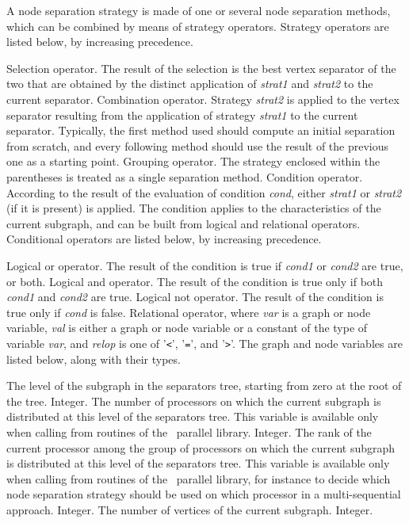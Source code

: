 A node separation strategy is made of one or several node separation
methods, which can be combined by means of strategy
operators. Strategy operators are listed below, by increasing
precedence.

\begin{itemize}
Selection operator. The result of the selection is the best vertex separator of
the two that are obtained by the distinct application of {\it strat1\/} and
{\it strat2\/} to the current separator.
Combination operator. Strategy {\it strat2\/} is applied to the vertex
separator resulting from the application of strategy {\it strat1\/} to the
current separator. Typically, the first method used should compute an initial
separation from scratch, and every following method should use the
result of the previous one as a starting point.
\iteme[{\tt (}{\it strat\/}{\tt )}]
Grouping operator.
The strategy enclosed within the parentheses is treated as a single
separation method.
Condition operator. According to the result of the evaluation of condition
{\it cond}, either {\it strat1\/} or {\it strat2\/} (if it is present) is
applied. The condition applies to the characteristics of the current subgraph,
and can be built from logical and relational operators. Conditional
operators are listed below, by increasing precedence.
\begin{itemize}
Logical or operator. The result of the condition is true if {\it cond1\/}
or {\it cond2\/} are true, or both.
Logical and operator. The result of the condition is true only if both
{\it cond1\/} and {\it cond2\/} are true.
\iteme[{\tt !}{\it cond}]
Logical not operator. The result of the condition is true only if
{\it cond\/} is false.
Relational operator, where {\it var\/} is a graph or node variable,
{\it val\/} is either a graph or node variable or a constant of the type of
variable {\it var\/}, and {\it relop\/} is one of
'{\tt\verb+<+}', '{\tt\verb+=+}', and '{\tt\verb+>+}'.
The graph and node variables are listed below, along with their types.
\begin{itemize}
\iteme[{\tt levl}]
The level of the subgraph in the separators tree, starting from zero at the root
of the tree.
Integer.
\iteme[{\tt proc}]
The number of processors on which the current subgraph is distributed
at this level of the separators tree. This variable is available only
when calling from routines of the \ptscotch\ parallel library.
Integer.
\iteme[{\tt rank}]
The rank of the current processor among the group of processors on
which the current subgraph is distributed at this level of the
separators tree. This variable is available only
when calling from routines of the \ptscotch\ parallel library, for
instance to decide which node separation strategy should be used on
which processor in a multi-sequential approach.
Integer.
\iteme[{\tt vert}]
The number of vertices of the current subgraph.
Integer.
\end{itemize}
\end{itemize}
\end{itemize}
